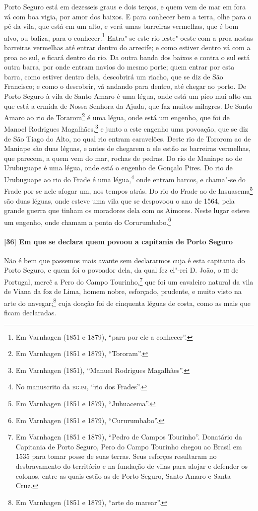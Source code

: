 \begin{linenumbers}
Porto Seguro está em dezesseis graus e dois terços, e quem vem de mar em fora vá com boa
vigia, por amor dos baixos. E para conhecer bem a terra, olhe para o pé da vila, que está
em um alto, e verá umas barreiras vermelhas, que é bom alvo, ou baliza, para o
conhecer.\footnote{ Em Varnhagen (1851 e 1879), ``para por ele a conhecer''.} Entra"-se
este rio leste"-oeste com a proa nestas barreiras vermelhas até entrar dentro do arrecife;
e como estiver dentro vá com a proa ao sul, e ficará dentro do rio. Da outra banda dos
baixos e contra o sul está outra barra, por onde entram navios do mesmo porte; quem entrar
por esta barra, como estiver dentro dela, descobrirá um riacho, que se diz de São
Francisco; e como o descobrir, vá andando para dentro, até chegar ao porto. De Porto
Seguro à vila de Santo Amaro é uma légua, onde está um pico mui alto em que está a ermida
de Nossa Senhora da Ajuda, que faz muitos milagres. De Santo Amaro ao rio de
Torarom\footnote{ Em Varnhagen (1851 e 1879), ``Tororam''.} é uma légua, onde está um
engenho, que foi de Manoel Rodrigues Magalhães,\footnote{ Em Varnhagen (1851), ``Manuel
Rodrigues Magalhães''.} e junto a este engenho uma povoação, que se diz de São Tiago do
Alto, no qual rio entram caravelões. Deste rio de Tororom ao de Maniape são duas léguas, e
antes de chegarem a ele estão as barreiras vermelhas, que parecem, a quem vem do mar,
rochas de pedras. Do rio de Maniape ao de Urubuguape é uma légua, onde está o engenho de
Gonçalo Pires. Do rio de Urubuguape ao rio do Frade é uma légua,\footnote{ No manuscrito
da \textsc{bgjm}, ``rio dos Frades''.} onde entram barcos, e chama"-se do Frade por se nele
afogar um, nos tempos atrás. Do rio do Frade ao de Insuasema\footnote{ Em Varnhagen (1851
e 1879), ``Juhuacema''.} são duas léguas, onde esteve uma vila que se despovoou o ano de
1564, pela grande guerra que tinham os moradores dela com os Aimores. Neste lugar esteve
um engenho, onde chamam a ponta do Corurumbabo.\footnote{ Em Varnhagen (1851 e 1879),
``Cururumbabo''.}

\paragraph{[36] Em que se declara quem povoou a capitania de Porto Seguro} \quad
Não é bem que passemos mais avante sem declararmos cuja é esta capitania do Porto Seguro,
e quem foi o povoador dela, da qual fez el"-rei D. João, o \textsc{iii} de Portugal, mercê
a Pero do Campo Tourinho,\footnote{ Em Varnhagen (1851 e 1879), ``Pedro de Campos
Tourinho''. Donatário da Capitania de Porto Seguro, Pero do Campo Tourinho chegou ao
Brasil em 1535 para tomar posse de suas terras. Seus esforços resultaram no desbravamento
do território e na fundação de vilas para alojar e defender os colonos, entre as quais
estão as de Porto Seguro, Santo Amaro e Santa Cruz.} que foi um cavaleiro natural da vila
de Viana da foz de Lima, homem nobre, esforçado, prudente, e muito visto na arte do
navegar;\footnote{ Em Varnhagen (1851 e 1879), ``arte do marear''.} cuja doação foi de
cinquenta léguas de costa, como as mais que ficam declaradas.


\end{linenumbers}
